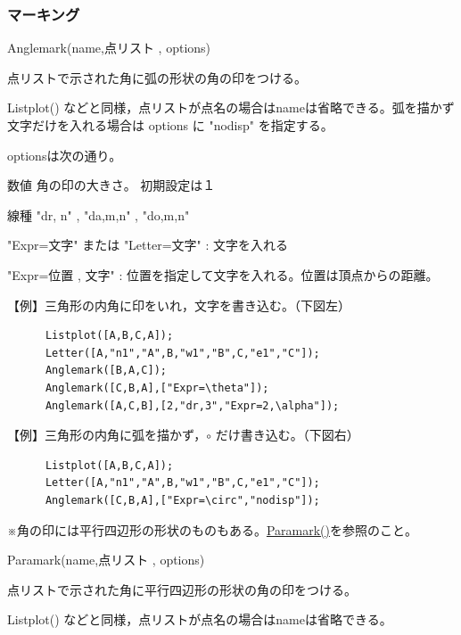 \documentclass[papersize,a4paper,12pt,uplatex]{jsarticle}
\begin{document}
\subsubsection{マーキング}
\begin{description}

\hypertarget{anglemark}{}
\item[関数]  Anglemark(name,点リスト , options)
\item[機能]  点リストで示された角に弧の形状の角の印をつける。
\item[説明]  Listplot() などと同様，点リストが点名の場合はnameは省略できる。弧を描かず文字だけを入れる場合は options に "nodisp" を指定する。

optionsは次の通り。

数値      角の印の大きさ。 初期設定は１

線種      "dr, n"  , "da,m,n" , "do,m,n"

"Expr=文字" または "Letter=文字" : 文字を入れる

"Expr=位置 , 文字"  : 位置を指定して文字を入れる。位置は頂点からの距離。

\vspace{\baselineskip}
【例】三角形の内角に印をいれ，文字を書き込む。（下図左）
\begin{verbatim}
      Listplot([A,B,C,A]);
      Letter([A,"n1","A",B,"w1","B",C,"e1","C"]);
      Anglemark([B,A,C]);
      Anglemark([C,B,A],["Expr=\theta"]);
      Anglemark([A,C,B],[2,"dr,3","Expr=2,\alpha"]);
\end{verbatim}

【例】三角形の内角に弧を描かず，$\circ$ だけ書き込む。（下図右）
\begin{verbatim}
      Listplot([A,B,C,A]);
      Letter([A,"n1","A",B,"w1","B",C,"e1","C"]);
      Anglemark([C,B,A],["Expr=\circ","nodisp"]);
\end{verbatim}


\hspace{5mm}

※角の印には平行四辺形の形状のものもある。\hyperlink{paramark}{Paramark()}を参照のこと。

\vspace{\baselineskip}
\hypertarget{paramark}{}
\item[関数]  Paramark(name,点リスト , options)
\item[機能]  点リストで示された角に平行四辺形の形状の角の印をつける。
\item[説明]  Listplot() などと同様，点リストが点名の場合はnameは省略できる。


\end{description}
\end{document}
